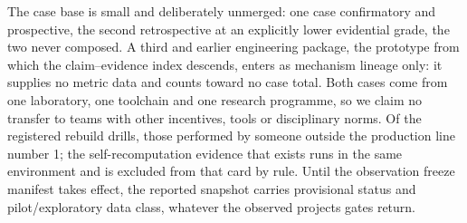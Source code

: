 \documentclass[
  english,
]{article}
\begin{document}
The case base is small and deliberately unmerged: one case confirmatory and prospective, the second retrospective at an explicitly lower evidential grade, the two never composed. A third and earlier engineering package, the prototype from which the claim--evidence index descends, enters as mechanism lineage only: it supplies no metric data and counts toward no case total. Both cases come from one laboratory, one toolchain and one research programme, so we claim no transfer to teams with other incentives, tools or disciplinary norms. Of the registered rebuild drills, those performed by someone outside the production line number 1; the self-recomputation evidence that exists runs in the same environment and is excluded from that card by rule. Until the observation freeze manifest takes effect, the reported snapshot carries provisional status and pilot/exploratory data class, whatever the observed projects\textquotesingle{} gates return.
\end{document}
